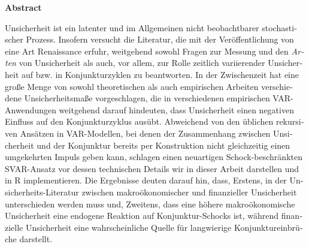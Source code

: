 \documentclass[a4paper,11pt,listof=nochaptergap,oneside,pointednumbers,bibtotoc,bigheadings,liststotoc,hidelinks]{scrbook}
\makeatletter
\theoremstyle{mysatz}
\theoremstyle{mydefinition}
\theoremstyle{mytheorem}
\theoremstyle{mybemerkung}
\newcommand\abstractname{Abstract}  %
\newenvironment{abstract}{%
      \titlepage
      \null\vfil
      \@beginparpenalty\@lowpenalty
      \begin{center}%
        \bfseries \abstractname
        \@endparpenalty\@M
      \end{center}}%
     {\par\vfil\null\endtitlepage}
\newenvironment{abstract}{%
      \if@twocolumn
        \section*{\abstractname}%
      \else
        \small
        \begin{center}%
          {\bfseries \abstractname\vspace{-.5em}\vspace{\z@}}%
        \end{center}%
        \quotation
      \fi}
      {\if@twocolumn\else\endquotation\fi}
\makeatother
\begin{document}
\begin{otherlanguage}{ngerman}
\begin{abstract}
Unsicherheit ist ein latenter und im Allgemeinen nicht beobachtbarer stochastischer Prozess. Insofern versucht die Literatur, die mit der Veröffentlichung von \citet{bloom:09} eine Art Renaissance erfuhr, weitgehend sowohl Fragen zur Messung und den \textit{Arten} von Unsicherheit als auch, vor allem, zur Rolle zeitlich variierender Unsicherheit auf bzw. in Konjunkturzyklen zu beantworten. In der Zwischenzeit hat eine große Menge von sowohl theoretischen als auch empirischen Arbeiten verschiedene Unsicherheitsmaße vorgeschlagen, die in verschiedenen empirischen VAR-Anwendungen weitgehend darauf hindeuten, dass Unsicherheit einen negativen Einfluss auf den Konjunkturzyklus ausübt. Abweichend von den üblichen rekursiven Ansätzen in VAR-Modellen, bei denen der Zusammenhang zwischen Unsicherheit und der Konjunktur bereits per Konstruktion nicht gleichzeitig einen umgekehrten Impuls geben kann, schlagen \citep{ludvigsonetal:18, ludvigsonetal:19} einen neuartigen Schock-beschränkten SVAR-Ansatz vor dessen technischen Details wir in dieser Arbeit darstellen und in R implementieren. Die Ergebnisse deuten darauf hin, dass, Erstens, in der Unsicherheits-Literatur zwischen makroökonomischer und finanzieller Unsicherheit unterschieden werden muss und, Zweitens, dass eine höhere makroökonomische Unsicherheit eine endogene Reaktion auf Konjunktur-Schocks ist, während finanzielle Unsicherheit eine wahrscheinliche Quelle für langwierige Konjunktureinbrüche darstellt.
\end{abstract}
\end{otherlanguage}






\restoregeometry

\thispagestyle{empty}
\pagestyle{fancy} %
\setcounter{page}{7} %
\tableofcontents
\newpage
\listoffigures

\newpage
\listoftables

\newpage

\end{document}
